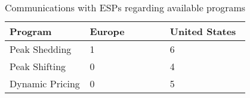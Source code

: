 \begin{table}[h]
\begin{center}
\begin{tabular}{|p{0.265\linewidth}|p{0.265\linewidth}|p{0.265\linewidth}|}
\hline
\textbf{Program} & \textbf{Europe} & \textbf{United States}\\
\hline
Peak Shedding & 1 & 6\\
\hline
Peak Shifting & 0 & 4\\
\hline
Dynamic Pricing & 0 & 5\\
\hline
\end{tabular}
\caption{Communications with ESPs regarding available programs}
\label{fig:table3}
\end{center}
\end{table}